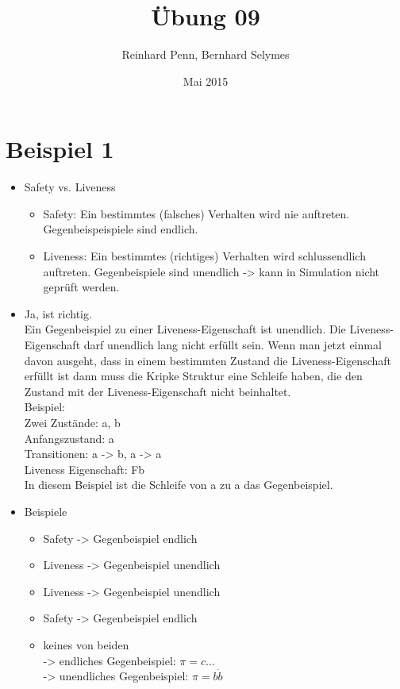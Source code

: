 \documentclass[12pt,a4paper]{article}
\begin{document}
\title{Übung 09}
\author{Reinhard Penn, Bernhard Selymes}
\date{Mai 2015}

\normalsize


\newcommand{\Uebung}{LTLCTL}



\section{Beispiel 1}

\begin{itemize}
	\item Safety vs. Liveness
		\begin{itemize}
			\item Safety: Ein bestimmtes (falsches) Verhalten wird nie auftreten. Gegenbeispeispiele sind endlich.
			\item Liveness: Ein bestimmtes (richtiges) Verhalten wird schlussendlich auftreten. Gegenbeispiele sind unendlich -> kann in Simulation nicht geprüft werden.
		\end{itemize}
	\item Ja, ist richtig.\\
	Ein Gegenbeispiel zu einer Liveness-Eigenschaft ist unendlich. Die Liveness-Eigenschaft darf unendlich lang nicht erfüllt sein. Wenn man jetzt einmal davon ausgeht, dass in einem bestimmten Zustand die Liveness-Eigenschaft erfüllt ist dann muss die Kripke Struktur eine Schleife haben, die den Zustand mit der Liveness-Eigenschaft nicht beinhaltet.\\
	Beispiel:\\
	Zwei Zustände: a, b\\
	Anfangszustand: a\\
	Transitionen: a -> b, a -> a\\
	Liveness Eigenschaft: Fb\\
	In diesem Beispiel ist die Schleife von a zu a das Gegenbeispiel.
	\item Beispiele
	\begin{itemize}
		\item Safety -> Gegenbeispiel endlich
		\item Liveness -> Gegenbeispiel unendlich
		\item Liveness -> Gegenbeispiel unendlich
		\item Safety -> Gegenbeispiel endlich
		\item keines von beiden\\
		-> endliches Gegenbeispiel: $\pi = c \ldots$\\
		-> unendliches Gegenbeispiel: $\pi = b\dot{b}$
	\end{itemize}
\end{itemize}	
	
\end{document}
